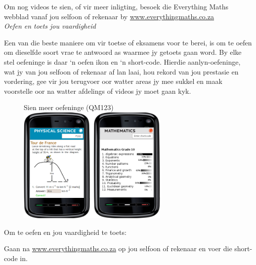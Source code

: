 \newpage
\thispagestyle{empty}
{

Om nog videos te sien, of vir meer inligting, besoek die Everything Maths webblad vanaf jou selfoon of rekenaar by \underline{www.everythingmaths.co.za}  
\vspace*{1cm}
\\
{\normalfont\sffamily\fontsize{22}\normalfont\itshape Oefen en toets jou vaardigheid} \par


Een van die beste maniere om vir toetse of eksamens voor te berei, is om te oefen om dieselfde soort vrae te antwoord as waarmee jy getoets gaan word. By elke stel oefeninge is daar ‘n oefen ikon en ‘n short-code. Hierdie aanlyn-oefeninge, wat jy van jou selfoon of rekenaar af lan laai, hou rekord van jou prestasie en vordering, gee vir jou terugvoer oor watter areas jy mee sukkel en maak voorstelle oor na watter afdelings of videos jy moet gaan kyk.


\begin{figure}[h]
\begin{center}
Sien meer oefeninge   (QM123)\\ 
\includegraphics[width=0.65\textwidth]{title_images/practicephones.png}
\end{center}
\end{figure}
\par


Om te oefen en jou vaardigheid te toets:\par

Gaan na \underline{www.everythingmaths.co.za} op jou selfoon of rekenaar en voer die short-code in.\partykeer
\vspace*{1cm}

}
